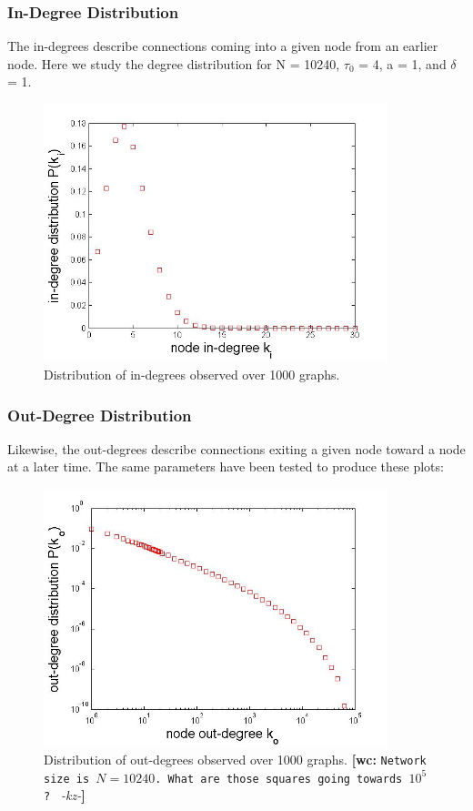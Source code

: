 \documentclass[preprint,notitlepage,amsmath,amssymb,floatfix]{revtex4-1}
\newcommand{\XXX}[3]{{\bf [#1: } {\tt #3} {\it -#2-}{\bf ]}}
\begin{document}
\subsubsection{In-Degree Distribution}
The in-degrees describe connections coming into a given node from an earlier node.  Here we study the degree distribution for N = 10240, $\tau_0$ = 4, a = 1, and $\delta$ = 1.

\begin{figure}
\includegraphics[width=10cm]{figures/in_degree_universe.jpg}
\caption{Distribution of in-degrees observed over 1000 graphs.}
\label{fig:in_deg_uni}
\centering
\end{figure}

\subsubsection{Out-Degree Distribution}
Likewise, the out-degrees describe connections exiting a given node toward a node at a later time.  The same parameters have been tested to produce these plots:

\begin{figure}
\includegraphics[width=10cm]{figures/out_degree_universe.jpg}
\caption{Distribution of out-degrees observed over 1000 graphs. \XXX{wc}{kz}{Network size is $N=10240$. What are those squares going towards $10^5$? }}
\label{fig:out_deg_uni}
\centering
\end{figure}
\end{document}
